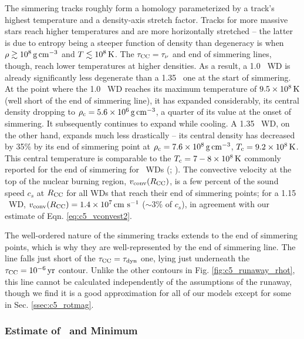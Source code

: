 
The simmering tracks roughly form a homology parameterized by a track's highest temperature and a density-axis stretch factor.  Tracks for more massive stars reach higher temperatures and are more horizontally stretched -- the latter is due to entropy being a steeper function of density than degeneracy is when $\rho\gtrsim10^8\,\gcc$ and $T\lesssim10^8\,\mathrm{K}$.  The $\taucc = \taunu$ and end of simmering lines, though, reach lower temperatures at higher densities.  As a result, a 1.0 \Msun\ WD is already significantly less degenerate than a 1.35 \Msun\ one at the start of simmering.  At the point where the 1.0 \Msun\ WD reaches its maximum temperature of $9.5\times10^8\,\mathrm{K}$ (well short of the end of simmering line), it has expanded considerably, its central density dropping to $\rhoc = 5.6\times10^6\,\gcc$, a quarter of its value at the onset of simmering.  It subsequently continues to expand while cooling.  A 1.35 \Msun\ WD, on the other hand, expands much less drastically -- its central density has decreased by 35\% by its end of simmering point at $\rhoc = 7.6\times10^8\,\gcc$, $\Tc = 9.2\times10^8\,\mrm{K}$.  This central temperature is comparable to the $\Tc = 7-8\times10^8\,\mrm{K}$ commonly reported for the end of simmering for \Mch\ WDs (\citeal{wooswk04}; \citeal{piroc08}).  The convective velocity at the top of the nuclear burning region, $\vconvrcc$, is a few percent of the sound speed $c_s$ at $\Rcc$ for all WDs that reach their end of simmering points; for a 1.15 \Msun\ WD, $\vconvrcc = 1.4\times10^7\,\cmpsec$ ($\sim3$\% of $c_s$), in agreement with our estimate of Eqn. \ref{eq:c5_vconvest2}.

The well-ordered nature of the simmering tracks extends to the end of simmering points, which is why they are well-represented by the end of simmering line.  The line falls just short of the $\taucc = \taudyn$ one, lying just underneath the $\taucc = 10^{-6}\,\mrm{yr}$ contour.  Unlike the other contours in Fig. \ref{fig:c5_runaway_rhot}, this line cannot be calculated independently of the assumptions of the runaway, though we find it is a good approximation for all of our models except for some in Sec. \ref{ssec:c5_rotmag}.

\subsubsection{Estimate of \Mcrit\ and Minimum \MNi}
\label{sssec:c5_mcritest_adiabatic}

